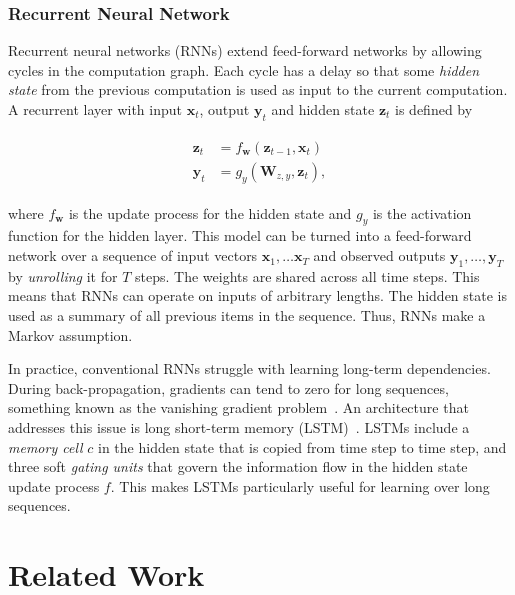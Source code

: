 
\subsubsection{Recurrent Neural Network}

Recurrent neural networks (RNNs) extend feed-forward networks by allowing cycles in the computation graph.
Each cycle has a delay so that some \textit{hidden state} from the previous computation is used as input to the current computation.
A recurrent layer with input \(\mathbf{x}_t\), output \(\mathbf{y}_t\) and hidden state \(\mathbf{z}_t\) is defined by

\begin{align}
    \begin{split}
        \mathbf{z}_t &= f_\mathbf{w}(\mathbf{z}_{t-1}, \mathbf{x}_t) \\
        \mathbf{y}_t &= g_y(\mathbf{W}_{z,y}, \mathbf{z}_t),
    \end{split}
\end{align}

where \(f_\mathbf{w}\) is the update process for the hidden state and \(g_y\) is the activation function for the hidden layer.
This model can be turned into a feed-forward network over a sequence of input vectors \(\mathbf{x}_1, \dots \mathbf{x}_T\) and observed outputs \(\mathbf{y}_1, \dots, \mathbf{y}_T\) by \textit{unrolling} it for \(T\) steps. The weights are shared across all time steps. This means that RNNs can operate on inputs of arbitrary lengths.
The hidden state is used as a summary of all previous items in the sequence.
Thus, RNNs make a Markov assumption.~\cite{russell_artificial_2021}

In practice, conventional RNNs struggle with learning long-term dependencies.
During back-propagation, gradients can tend to zero for long sequences, something known as the vanishing gradient problem~\cite{goodfellow_deep_2016}.
An architecture that addresses this issue is long short-term memory (LSTM)~\cite{hochreiter_schmidhuber_lstm_1997}.
LSTMs include a \textit{memory cell} \(c\) in the hidden state that is copied from time step to time step, and three soft \textit{gating units} that govern the information flow in the hidden state update process \(f\). This makes LSTMs particularly useful for learning over long sequences.

\section{Related Work}

